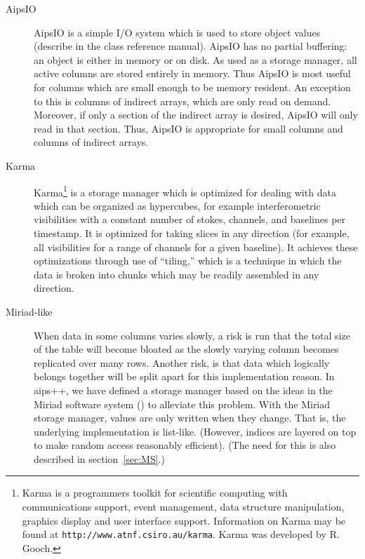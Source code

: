 \begin{description}
\item [AipsIO]
      AipsIO is a simple I/O system which is used to store object
      values (describe in the class reference manual). AipsIO has no partial
      buffering: an object is either in memory or on disk. As used
      as a storage manager, all active columns are stored entirely in memory.
      Thus AipsIO is most useful for columns which are small enough to
      be memory resident. An exception to this is columns of
      indirect arrays, which are only read on demand. Moreover, if only
      a section of the indirect array is desired, AipsIO will only
      read in that section. Thus, AipsIO is
      appropriate for small columns and columns of indirect
      arrays.

\item [Karma]
      Karma\footnote{Karma is a programmers toolkit for scientific
      computing with communications support, event management, 
      data structure manipulation, graphics display and user interface
      support. Information on Karma may be found at 
      {\tt http://www.atnf.csiro.au/karma}. Karma was developed by R. Gooch.}
      is a storage manager which is optimized for
      dealing with data which can be organized as hypercubes, for
      example interferometric visibilities with a constant number of
      stokes, channels, and baselines per timestamp. It is optimized
      for taking slices in any direction (for example, all
      visibilities for a range of channels for a given baseline). It
      achieves these optimizations through use of ``tiling,'' which is
      a technique in which the data is broken into chunks which
      may be readily assembled in any direction.

\item [Miriad-like]
      When data in some columns varies slowly, a risk is run that the total
      size of the table will become bloated as the slowly varying column
      becomes replicated over many rows. Another risk, is that data which
      logically belongs together will be split apart for this implementation
      reason. In {\sc aips++}, we have 
      defined a storage manager based on the ideas
      in the Miriad software system (\cite{stw:miriad}) 
      to alleviate this problem.
      With the Miriad storage manager, values are only written when
      they change. That is, the underlying implementation is
      list-like. (However, indices are layered on top to make random
      access reasonably efficient). (The need for this is also
      described in section~\ref{sec:MS}.)
\end{description}

